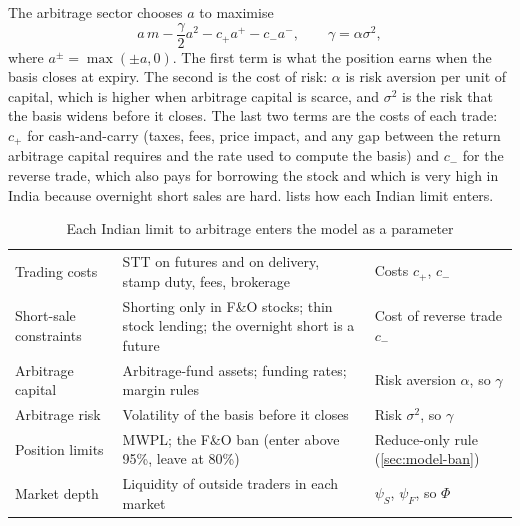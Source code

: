 The arbitrage sector chooses $a$ to maximise
\begin{equation}\label{eq:objective}
a\,m-\frac{\gamma}{2}a^2-c_+a^+-c_-a^-,\qquad \gamma=\alpha\sigma^2 ,
\end{equation}
where $a^\pm=\max(\pm a,0)$. The first term is what the position earns when the basis closes at expiry. The second is
the cost of risk: $\alpha$ is risk aversion per unit of capital, which is higher when arbitrage capital is scarce, and
$\sigma^2$ is the risk that the basis widens before it closes. The last two terms are the costs of each trade: $c_+$
for cash-and-carry (taxes, fees, price impact, and any gap between the return arbitrage capital requires and the rate
used to compute the basis) and $c_-$ for the reverse trade, which also pays for borrowing the stock and which is very
high in India because overnight short sales are hard.  lists how each Indian limit enters.

\begin{table}[t]
\caption{Each Indian limit to arbitrage enters the model as a parameter}\label{tab:params}
\small\begin{tabularx}{\linewidth}{@{}K{3.0cm}L>{\raggedright\arraybackslash}p{3.3cm}@{}}
\toprule
{} &  &  \\
\midrule
Trading costs & STT on futures and on delivery, stamp duty, fees, brokerage & Costs $c_+$, $c_-$ \\ \rowrule
Short-sale constraints & Shorting only in F\&O stocks; thin stock lending; the overnight short is a future & Cost of reverse trade $c_-$ \\ \rowrule
Arbitrage capital & Arbitrage-fund assets; funding rates; margin rules & Risk aversion $\alpha$, so $\gamma$ \\ \rowrule
Arbitrage risk & Volatility of the basis before it closes & Risk $\sigma^2$, so $\gamma$ \\ \rowrule
Position limits & MWPL; the F\&O ban (enter above 95\%, leave at 80\%) & Reduce-only rule (\cref{sec:model-ban}) \\ \rowrule
Market depth & Liquidity of outside traders in each market & $\psi_S$, $\psi_F$, so $\Phi$ \\
\bottomrule
\end{tabularx}
\end{table}

